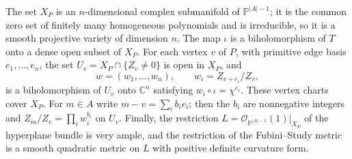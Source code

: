 \begin{theorem}\label{thm:delzant-projective-monomial-charts}
The set $X_P$ is an $n$-dimensional complex submanifold of $\mathbb P^{|A|-1}$; it is the common zero set of finitely many homogeneous polynomials and is irreducible, so it is a smooth projective variety of dimension $n$. The map $\iota$ is a biholomorphism of $T$ onto a dense open subset of $X_P$. For each vertex $v$ of $P$, with primitive edge basis $e_1,\ldots,e_n$, the set $U_v=X_P\cap\{Z_v\neq0\}$ is open in $X_P$, and
\[
 w=(w_1,\ldots,w_n),\qquad w_i=Z_{v+e_i}/Z_v,
\]
is a biholomorphism of $U_v$ onto $\mathbb C^n$ satisfying $w_i\circ\iota=\chi^{e_i}$. These vertex charts cover $X_P$. For $m\in A$ write $m-v=\sum_i b_i e_i$; then the $b_i$ are nonnegative integers and $Z_m/Z_v=\prod_i w_i^{b_i}$ on $U_v$. Finally, the restriction $L=\mathcal O_{\mathbb P^{|A|-1}}(1)|_{X_P}$ of the hyperplane bundle is very ample, and the restriction of the Fubini--Study metric is a smooth quadratic metric on $L$ with positive definite curvature form.
\end{theorem}
